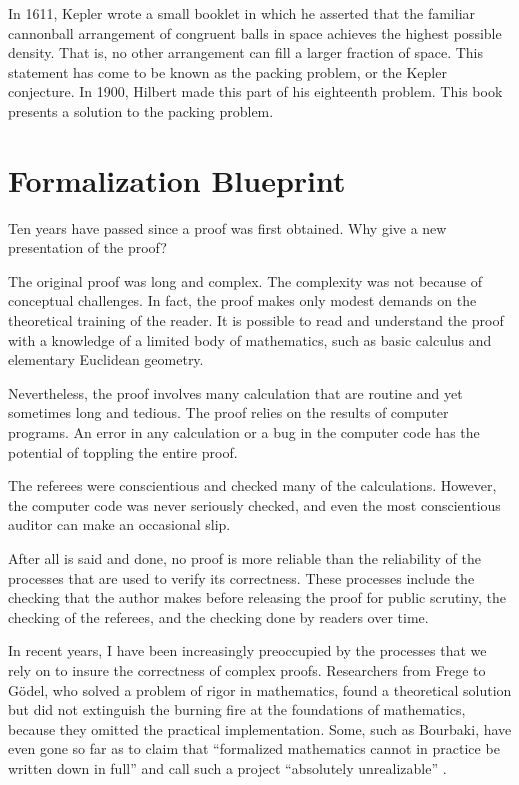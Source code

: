 

In 1611, Kepler wrote a small booklet in which he asserted that the familiar cannonball arrangement of congruent balls in space achieves the highest possible density.  That is, no other arrangement can fill a larger fraction of space.  This statement has come to be known as the packing problem, or the Kepler conjecture.  In 1900, Hilbert made this part of his eighteenth problem.  This book presents a solution to the packing problem.

\section{Formalization Blueprint}

Ten years have passed since a proof was first
obtained. Why give a new presentation of the proof?

The original proof was long and complex.  The complexity was not
because of conceptual challenges.  In fact, the proof makes only
modest demands on the theoretical training of the reader.  It is
possible to read and understand the proof with a knowledge of a
limited body of mathematics, such as basic calculus and elementary
Euclidean geometry.

Nevertheless, the proof involves many  calculation that are routine
and yet sometimes long and tedious.  The proof relies on the results
of computer programs.  An error in any calculation or a bug in the
computer code has the potential of toppling the entire proof.

The referees were conscientious and checked many of the
calculations.  However, the computer code was never seriously
checked, and even the most conscientious auditor can make an
occasional slip.

After all is said and done, no proof is more reliable than the
reliability of the processes that are used to verify its
correctness.  These processes include the checking that the author
makes before releasing the proof for public scrutiny, the checking
of the referees, and the checking done by readers over time.

In recent years, I have been increasingly preoccupied by the
processes that we rely on to insure the correctness of complex
proofs. Researchers from Frege to G\"odel, who solved a problem of
rigor in mathematics, found a theoretical solution but did not
extinguish the burning fire at the foundations of mathematics,
because they omitted the practical implementation. Some, such as
Bourbaki, have even gone so far as to claim that ``formalized
mathematics cannot in practice be written down in full'' and call
such a project
``absolutely unrealizable'' \cite[p 10,11]{Bo}. %

